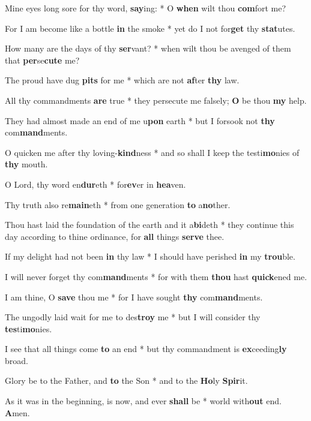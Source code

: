 \begin{multicols}{2}
	Mine eyes long sore for thy word, \textbf{say}ing: * O \textbf{when} wilt thou \textbf{com}fort me?
	
	For I am become like a bottle \textbf{in} the smoke * yet do I not for\textbf{get} thy \textbf{stat}utes.
	
	How many are the days of thy \textbf{ser}vant? * when wilt thou be avenged of them that \textbf{per}se\textbf{cute} me?
	
	The proud have dug \textbf{pits} for me * which are not \textbf{af}ter \textbf{thy} law.
	
	All thy commandments \textbf{are} true * they persecute me falsely; \textbf{O} be thou \textbf{my} help.
	
	They had almost made an end of me u\textbf{pon} earth * but I forsook not \textbf{thy} com\textbf{mand}ments.
	
	O quicken me after thy loving-\textbf{kind}ness * and so shall I keep the testi\textbf{mo}nies of \textbf{thy} mouth.
	
	O Lord, thy word en\textbf{dur}eth * for\textbf{ev}er in \textbf{hea}ven.
	
	Thy truth also re\textbf{main}eth * from one generation \textbf{to} a\textbf{no}ther.
	
	Thou hast laid the foundation of the earth and it a\textbf{bi}deth * they continue this day according to thine ordinance, for \textbf{all} things \textbf{serve} thee.
	
	If my delight had not been \textbf{in} thy law * I should have perished \textbf{in} my \textbf{trou}ble.
	
	I will never forget thy com\textbf{mand}ments * for with them \textbf{thou} hast \textbf{quick}ened me.
	
	I am thine, O \textbf{save} thou me * for I have sought \textbf{thy} com\textbf{mand}ments.
	
	The ungodly laid wait for me to des\textbf{troy} me * but I will consider thy \textbf{tes}ti\textbf{mo}nies.
	
	I see that all things come \textbf{to} an end * but thy commandment is \textbf{ex}ceeding\textbf{ly} broad.
	
	Glory be to the Father, and \textbf{to} the Son * and to the \textbf{Ho}ly \textbf{Spir}it.
	
	As it was in the beginning, is now, and ever \textbf{shall} be * world with\textbf{out} end. \textbf{A}men.
\end{multicols}